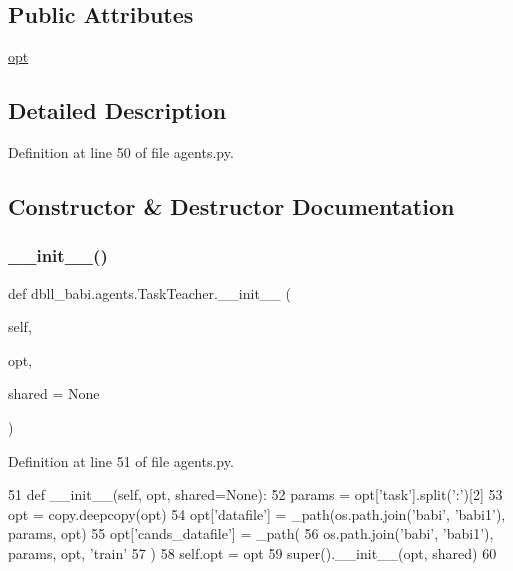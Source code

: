 \subsection*{Public Attributes}
\begin{DoxyCompactItemize}
\item 
\hyperlink{classdbll__babi_1_1agents_1_1TaskTeacher_abe6872d5eda75ca8a15ecf4785086c48}{opt}
\end{DoxyCompactItemize}


\subsection{Detailed Description}


Definition at line 50 of file agents.\+py.



\subsection{Constructor \& Destructor Documentation}
\mbox{\label{classdbll__babi_1_1agents_1_1TaskTeacher_a98b7cf17bf8248372e08889b3fe30ac5}} 
\subsubsection{\texorpdfstring{\+\_\+\+\_\+init\+\_\+\+\_\+()}{\_\_init\_\_()}}
{\footnotesize\ttfamily def dbll\+\_\+babi.\+agents.\+Task\+Teacher.\+\_\+\+\_\+init\+\_\+\+\_\+ (\begin{DoxyParamCaption}\item[{}]{self,  }\item[{}]{opt,  }\item[{}]{shared = {\ttfamily None} }\end{DoxyParamCaption})}



Definition at line 51 of file agents.\+py.


\begin{DoxyCode}
51     \textcolor{keyword}{def }\_\_init\_\_(self, opt, shared=None):
52         params = opt[\textcolor{stringliteral}{'task'}].split(\textcolor{stringliteral}{':'})[2]
53         opt = copy.deepcopy(opt)
54         opt[\textcolor{stringliteral}{'datafile'}] = \_path(os.path.join(\textcolor{stringliteral}{'babi'}, \textcolor{stringliteral}{'babi1'}), params, opt)
55         opt[\textcolor{stringliteral}{'cands\_datafile'}] = \_path(
56             os.path.join(\textcolor{stringliteral}{'babi'}, \textcolor{stringliteral}{'babi1'}), params, opt, \textcolor{stringliteral}{'train'}
57         )
58         self.opt = opt
59         super().\_\_init\_\_(opt, shared)
60 
\end{DoxyCode}


